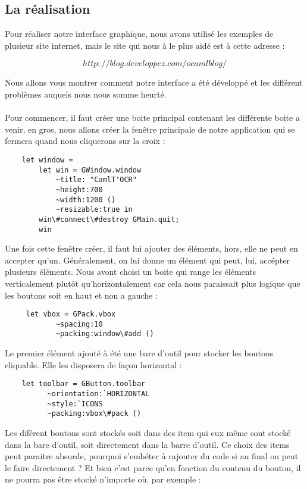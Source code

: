 	\subsection{La réalisation}
	Pour réaliser notre interface graphique, nous avons utilisé les exemples de plusieur site internet, mais le site qui nous à le plus aidé est à cette adresse :
	\begin{center}
	\[http://blog.developpez.com/ocamlblog/\]
	\end{center}
	Nous allons vous montrer comment notre interface a été développé et les différent problèmes auquels nous nous somme heurté.\\
	\\
	Pour commencer, il faut créer une boite principal contenant les différente boite a venir, en gros, nous allons créer la fenêtre principale de notre application qui se fermera quand nous cliquerons sur la croix :
	
	\begin{lstlisting}
	let window =
		let win = GWindow.window
			~title: "CamlT'OCR"
			~height:700
			~width:1200 ()
			~resizable:true in
		win\#connect\#destroy GMain.quit;
		win 
	\end{lstlisting}

	Une fois cette fenêtre créer, il faut lui ajouter des éléments, hors, elle ne peut en accepter qu'un. Généralement, on lui donne un élément qui peut, lui, accépter plusieurs éléments. Nous avont choisi un boite qui range les éléments verticalement plutôt qu'horizontalement car cela nous paraissait plus logique que les boutons soit en haut et non a gauche :\\
	
	\begin{lstlisting}
	 let vbox = GPack.vbox
			~spacing:10
			~packing:window\#add () 
	\end{lstlisting}

	Le premier élément ajouté à été une bare d'outil pour stocker les boutons cliquable. Elle les disposera de façon horizontal : 

	\begin{lstlisting}
	let toolbar = GButton.toolbar
		  ~orientation:`HORIZONTAL
		  ~style:`ICONS
		  ~packing:vbox\#pack ()
	\end{lstlisting}

	Les diférent boutons sont stockés soit dans des item qui eux même sont stocké dans la bare d'outil, soit directement dans la barre d'outil. Ce choix des items peut paraitre absurde, pourquoi s'embéter à rajouter du code si au final on peut le faire directement ? Et bien c'est parce qu'en fonction du contenu du bouton, il ne pourra pas être stocké n'importe où. par exemple :\\ 

